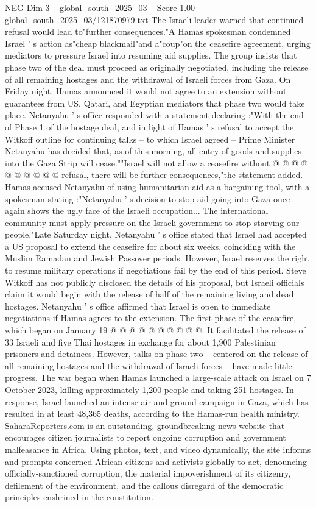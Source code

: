 \begin{textsample}{NEG Dim 3 – global\_south\_2025\_03 – Score 1.00 – global\_south\_2025\_03/121870979.txt}  \label{ex:f3_neg_422}
The Israeli leader warned that continued refusal would lead to"further consequences."A Hamas spokesman condemned Israel ' s action as"cheap blackmail"and a"coup"on the ceasefire agreement, urging mediators to pressure Israel into resuming aid supplies.
The group insists that phase two of the deal must proceed as originally negotiated, including the release of all remaining hostages and the withdrawal of Israeli forces from Gaza.
On Friday night, Hamas announced it would not agree to an extension without guarantees from US, Qatari, and Egyptian mediators that phase two would take place.
Netanyahu ' s office responded with a statement declaring :"With the end of Phase 1 of the hostage deal, and in light of Hamas ' s refusal to accept the Witkoff outline for continuing talks -- to which Israel agreed -- Prime Minister Netanyahu has decided that, as of this morning, all entry of goods and supplies into the Gaza Strip will cease.""Israel will not allow a ceasefire without @ @ @ @ @ @ @ @ @ @ refusal, there will be further consequences,"the statement added.
Hamas accused Netanyahu of using humanitarian aid as a bargaining tool, with a spokesman stating :"Netanyahu ' s decision to stop aid going into Gaza once again shows the ugly face of the Israeli occupation...
The international community must apply pressure on the Israeli government to stop starving our people."Late Saturday night, Netanyahu ' s office stated that Israel had accepted a US proposal to extend the ceasefire for about six weeks, coinciding with the Muslim Ramadan and Jewish Passover periods.
However, Israel reserves the right to resume military operations if negotiations fail by the end of this period.
Steve Witkoff has not publicly disclosed the details of his proposal, but Israeli officials claim it would begin with the release of half of the remaining living and dead hostages.
Netanyahu ' s office affirmed that Israel is open to immediate negotiations if Hamas agrees to the extension.
The first phase of the ceasefire, which began on January 19 @ @ @ @ @ @ @ @ @ @.
It facilitated the release of 33 Israeli and five Thai hostages in exchange for about 1,900 Palestinian prisoners and detainees.
However, talks on phase two -- centered on the release of all remaining hostages and the withdrawal of Israeli forces -- have made little progress.
The war began when Hamas launched a large-scale attack on Israel on 7 October 2023, killing approximately 1,200 people and taking 251 hostages.
In response, Israel launched an intense air and ground campaign in Gaza, which has resulted in at least 48,365 deaths, according to the Hamas-run health ministry.
SaharaReporters.com is an outstanding, groundbreaking news website that encourages citizen journalists to report ongoing corruption and government malfeasance in Africa.
Using photos, text, and video dynamically, the site informs and prompts concerned African citizens and activists globally to act, denouncing officially-sanctioned corruption, the material impoverishment of its citizenry, defilement of the environment, and the callous disregard of the democratic principles enshrined in the constitution.

\end{textsample}
